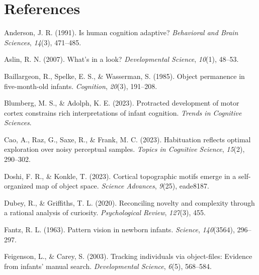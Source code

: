 \documentclass[10pt, letterpaper]{article}
\newenvironment{CSLReferences}%
  {}%
  {\par}
\begin{document}
\hypertarget{references}{%
\section{References}\label{references}}

\setlength{\parindent}{-0.1in} 
\setlength{\leftskip}{0.125in}

\noindent

\hypertarget{refs}{}
\begin{CSLReferences}{1}{0}
\leavevmode{}%
Anderson, J. R. (1991). Is human cognition adaptive? \emph{Behavioral
and Brain Sciences}, \emph{14}(3), 471--485.

\leavevmode{}%
Aslin, R. N. (2007). What's in a look? \emph{Developmental Science},
\emph{10}(1), 48--53.

\leavevmode{}%
Baillargeon, R., Spelke, E. S., \& Wasserman, S. (1985). Object
permanence in five-month-old infants. \emph{Cognition}, \emph{20}(3),
191--208.

\leavevmode{}%
Blumberg, M. S., \& Adolph, K. E. (2023). Protracted development of
motor cortex constrains rich interpretations of infant cognition.
\emph{Trends in Cognitive Sciences}.

\leavevmode{}%
Cao, A., Raz, G., Saxe, R., \& Frank, M. C. (2023). Habituation reflects
optimal exploration over noisy perceptual samples. \emph{Topics in
Cognitive Science}, \emph{15}(2), 290--302.

\leavevmode{}%
Doshi, F. R., \& Konkle, T. (2023). Cortical topographic motifs emerge
in a self-organized map of object space. \emph{Science Advances},
\emph{9}(25), eade8187.

\leavevmode{}%
Dubey, R., \& Griffiths, T. L. (2020). Reconciling novelty and
complexity through a rational analysis of curiosity. \emph{Psychological
Review}, \emph{127}(3), 455.

\leavevmode{}%
Fantz, R. L. (1963). Pattern vision in newborn infants. \emph{Science},
\emph{140}(3564), 296--297.

\leavevmode{}%
Feigenson, L., \& Carey, S. (2003). Tracking individuals via
object-files: Evidence from infants' manual search. \emph{Developmental
Science}, \emph{6}(5), 568--584.


\end{CSLReferences}
\end{document}
